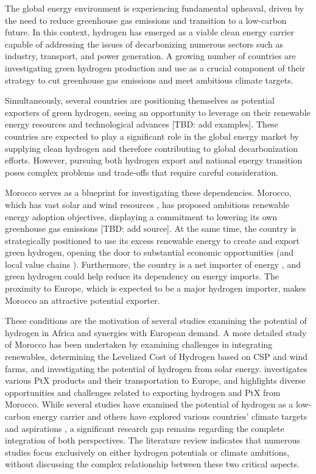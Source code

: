 The global energy environment is experiencing fundamental upheaval, driven by the need to reduce greenhouse gas emissions and transition to a low-carbon future. In this context, hydrogen has emerged as a viable clean energy carrier capable of addressing the issues of decarbonizing numerous sectors such as industry, transport, and power generation. A growing number of countries are investigating green hydrogen production and use as a crucial component of their strategy to cut greenhouse gas emissions and meet ambitious climate targets.

Simultaneously, several countries are positioning themselves as potential exporters of green hydrogen, seeing an opportunity to leverage on their renewable energy resources and technological advances [TBD: add examples]. These countries are expected to play a significant role in the global energy market by supplying clean hydrogen and therefore contributing to global decarbonization efforts. However, pursuing both hydrogen export and national energy transition poses complex problems and trade-offs that require careful consideration.

Morocco serves as a blueprint for investigating these dependencies. Morocco, which has vast solar and wind resources \cite{Peters2023, Touili2018, Sterl2022}, has proposed ambitious renewable energy adoption objectives, displaying a commitment to lowering its own greenhouse gas emissions [TBD: add source]. At the same time, the country is strategically positioned to use its excess renewable energy to create and export green hydrogen, opening the door to substantial economic opportunities (and local value chains \cite{Ersoy2022}). Furthermore, the country is a net importer of energy \cite{IEA2022}, and green hydrogen could help reduce its dependency on energy imports. The proximity to Europe, which is expected to be a major hydrogen importer, makes Morocco an attractive potential exporter. %

These conditions are the motivation of several studies \cite{Wijk2021, AbouSeada2022, Zwaan2021, Schellekens2010, Cavana2021, Touili2022, Timmerberg2019, Sens2022} examining the potential of hydrogen in Africa and synergies with European demand. A more detailed study of Morocco has been undertaken by \cite{Boulakhbar2020} examining challenges in integrating renewables, \cite{Khouya2020} determining the Levelized Cost of Hydrogen based on CSP and wind farms, and \cite{Touili2018} investigating the potential of hydrogen from solar energy. \cite{Hampp2021} investigates various PtX products and their transportation to Europe, and \cite{Eichhammer2019} highlights diverse opportunities and challenges related to exporting hydrogen and PtX from Morocco. While several studies have examined the potential of hydrogen as a low-carbon energy carrier \cite{Hampp2021, AbouSeada2022, Wijk2021} and others have explored various countries' climate targets and aspirations \cite{Boulakhbar2020}, a significant research gap remains regarding the complete integration of both perspectives. The literature review indicates that numerous studies focus exclusively on either hydrogen potentials or climate ambitions, without discussing the complex relationship between these two critical aspects.

